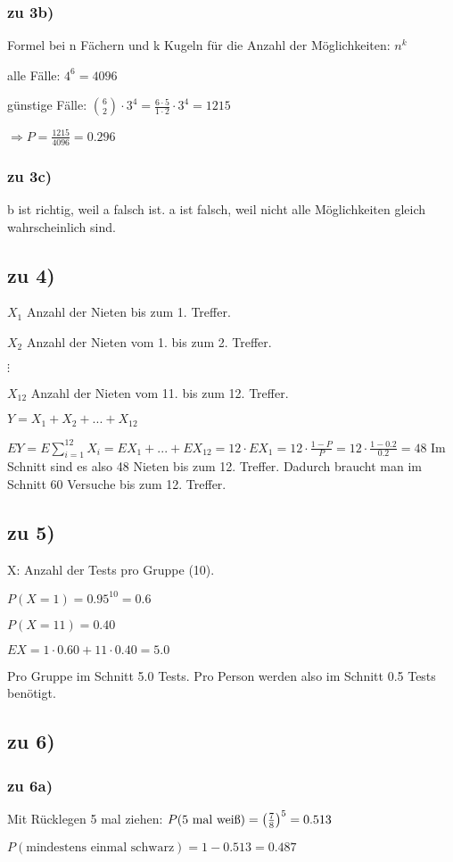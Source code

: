 \subsubsection{zu 3b)}
Formel bei n Fächern und k Kugeln für die Anzahl der Möglichkeiten: $ n^k $

alle Fälle: $4^6 = 4096 $

günstige Fälle: $ \binom 6 2 \cdot 3^4 = \frac{6\cdot 5}{1\cdot 2} \cdot 3^4 = 1215 $   

$\Rightarrow P = \frac{1215}{4096} = 0.296$

\subsubsection{zu 3c)}
b ist richtig, weil a falsch ist. a ist falsch, weil nicht alle Möglichkeiten gleich wahrscheinlich sind. 

\subsection{zu 4)}
$ X_1 $ Anzahl der Nieten bis zum 1. Treffer. 

$ X_2 $ Anzahl der Nieten vom 1. bis zum 2. Treffer. 

$ \vdots $

$ X_{12} $ Anzahl der Nieten vom 11. bis zum 12. Treffer. 

$ Y = X_1 + X_2 + ... + X_{12}$

$EY = E \sum_{i=1}^{12} X_i = EX_1 + ... + EX_{12} = 12\cdot EX_1 = 12 \cdot \frac{1-P}{P} = 12\cdot \frac{1-0.2}{0.2} = 48$ 
Im Schnitt sind es also 48 Nieten bis zum 12. Treffer. Dadurch braucht man im Schnitt 60 Versuche bis zum 12. Treffer. 

\subsection{zu 5)}
X: Anzahl der Tests pro Gruppe (10).

$ P(X=1) = 0.95^{10} = 0.6 $

$ P(X=11) = 0.40 $

$ EX = 1\cdot 0.60 + 11\cdot 0.40 = 5.0$

Pro Gruppe im Schnitt 5.0 Tests. Pro Person werden also im Schnitt 0.5 Tests benötigt. \\

\subsection{zu 6)}

\subsubsection{zu 6a)}
Mit Rücklegen 5 mal ziehen: $ P(\textrm{5 mal weiß}) =  \left( \frac{7}{8} \right) ^5 = 0.513 $

$ P(\textrm{mindestens einmal schwarz}) = 1 - 0.513 = 0.487 $